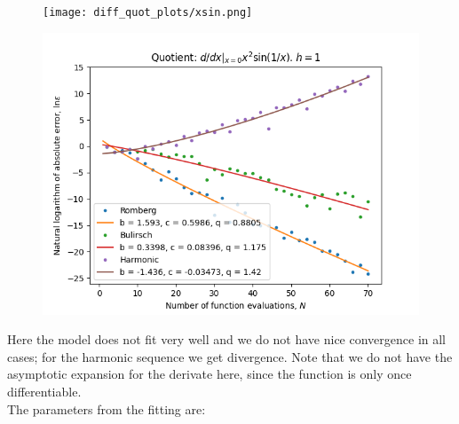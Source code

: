 \begin{figure}[H]
\centering
\begin{minipage}{0.45\textwidth}
\centering
\texttt{[image: diff\_quot\_plots/xsin.png]}
\end{minipage}
\begin{minipage}{0.45\textwidth}
\centering
\includegraphics[scale=0.45]{diff_quot_plots/xsin_hp_trend.png}
\end{minipage}
\end{figure}

Here the model does not fit very well and we do not have nice convergence in all cases; for the harmonic sequence we get divergence. Note that we do not have the asymptotic expansion for the derivate here, since the function is only once differentiable.\\

The parameters from the fitting are: 

